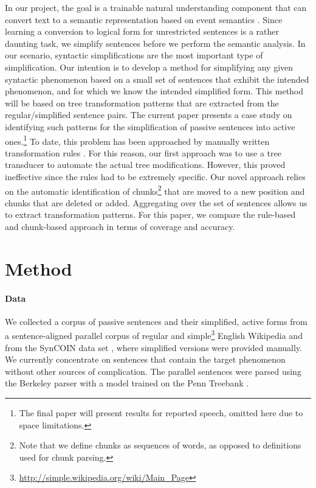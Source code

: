 \documentclass[a4paper,11pt]{article}
\begin{document}
In our project, the goal is a trainable natural understanding component that can convert text to a semantic representation based on event semantics \cite{sauri:littman:ea:06}. Since learning a conversion to logical form for unrestricted sentences is a rather daunting task, we simplify sentences before we perform the semantic analysis. In our scenario, syntactic simplifications are the most important type of simplification. Our intention is to develop a method for simplifying any given syntactic phenomenon based on a small set of sentences that exhibit the intended phenomenon, and for which we know the intended simplified form. This method will be based on tree transformation patterns that are extracted from the regular/simplified sentence pairs. The current paper presents a case study on identifying such patterns for the simplification of passive sentences into active ones.\footnote{The final paper will present results for reported speech, omitted here due to space limitations.} To date, this problem has been approached by manually written transformation rules \cite{carroll:minnen:ea:99.2,dornescu:evans:ea:13,inui:fujitsa:ea:03,siddhartan:02}. For this reason, our first approach was to use a tree transducer to automate the actual tree modifications. However, this proved ineffective since the rules had to be extremely specific. %
Our novel approach relies on the automatic identification of chunks\footnote{Note that we define chunks as sequences of words, as opposed to definitions used for chunk parsing.} that are moved to a new position and chunks that are deleted or added. Aggregating over the set of sentences allows us to extract transformation patterns. For this paper, we compare the rule-based and chunk-based approach in terms of coverage and accuracy.


\section{Method}

\paragraph{Data}
We collected a corpus of passive sentences and their simplified, active forms  from a sentence-aligned parallel corpus of regular  and simple\footnote{\url{http://simple.wikipedia.org/wiki/Main_Page}} English Wiki\-pedia and from the SynCOIN data set \cite{graham:rimland:11}, where simplified versions were provided manually.  We currently concentrate on sentences that contain the target phenomenon without  other sources of complication. 
The parallel sentences were parsed using the Berkeley parser with a model trained on the Penn Treebank \cite{marcus:santorini:ea:93}.
\end{document}
